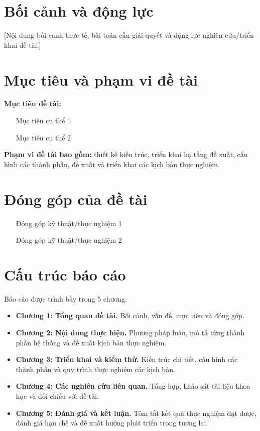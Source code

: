 \section{Bối cảnh và động lực}
[Nội dung bối cảnh thực tế, bài toán cần giải quyết và động lực nghiên cứu/triển khai đề tài.]

\section{Mục tiêu và phạm vi đề tài}
\textbf{Mục tiêu đề tài:}
\begin{itemize}
    \item [Mục tiêu cụ thể 1]
    \item [Mục tiêu cụ thể 2]
\end{itemize}

\textbf{Phạm vi đề tài bao gồm:} thiết kế kiến trúc, triển khai hạ tầng đề xuất, cấu hình các thành phần, đề xuất và triển khai các kịch bản thực nghiệm.

\section{Đóng góp của đề tài}
\begin{itemize}
    \item [Đóng góp kỹ thuật/thực nghiệm 1]
    \item [Đóng góp kỹ thuật/thực nghiệm 2]
\end{itemize}

\section{Cấu trúc báo cáo}
Báo cáo được trình bày trong 5 chương:
\begin{itemize}[label=-]
    \item \textbf{Chương 1: Tổng quan đề tài.} Bối cảnh, vấn đề, mục tiêu và đóng góp.
    \item \textbf{Chương 2: Nội dung thực hiện.} Phương pháp luận, mô tả từng thành phần hệ thống và đề xuất kịch bản thực nghiệm.
    \item \textbf{Chương 3: Triển khai và kiểm thử.} Kiến trúc chi tiết, cấu hình các thành phần và quy trình thực nghiệm các kịch bản.
    \item \textbf{Chương 4: Các nghiên cứu liên quan.} Tổng hợp, khảo sát tài liệu khoa học và đối chiếu với đề tài.
    \item \textbf{Chương 5: Đánh giá và kết luận.} Tóm tắt kết quả thực nghiệm đạt được, đánh giá hạn chế và đề xuất hướng phát triển trong tương lai.
\end{itemize}
